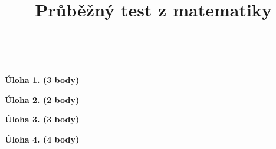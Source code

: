 \documentclass{article}
\title{Průběžný test z matematiky}
\date{}
\begin{document}
    \maketitle
    ~
    
    

    \textbf{Úloha 1. (3 body)}
    
    
    \textbf{Úloha 2. (2 body)}
    
    
    \textbf{Úloha 3. (3 body)}
    

    \textbf{Úloha 4. (4 body)}
    
\end{document}
